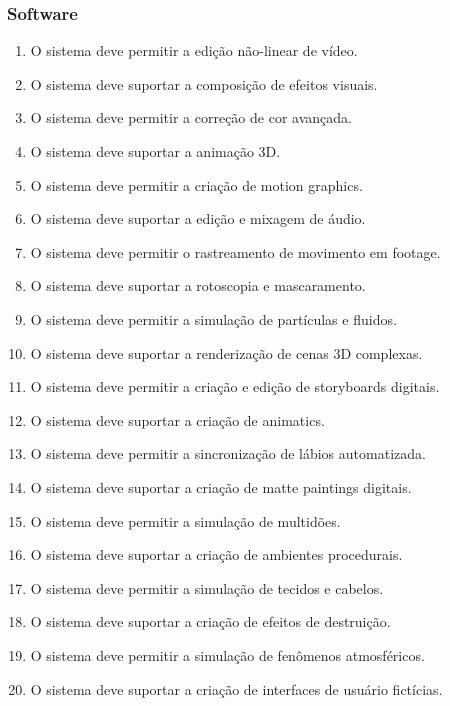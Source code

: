 \subsubsection{Software}
\begin{enumerate}
  \item O sistema deve permitir a edição não-linear de vídeo.
  \item O sistema deve suportar a composição de efeitos visuais.
  \item O sistema deve permitir a correção de cor avançada.
  \item O sistema deve suportar a animação 3D.
  \item O sistema deve permitir a criação de motion graphics.
  \item O sistema deve suportar a edição e mixagem de áudio.
  \item O sistema deve permitir o rastreamento de movimento em footage.
  \item O sistema deve suportar a rotoscopia e mascaramento.
  \item O sistema deve permitir a simulação de partículas e fluidos.
  \item O sistema deve suportar a renderização de cenas 3D complexas.
  \item O sistema deve permitir a criação e edição de storyboards digitais.
  \item O sistema deve suportar a criação de animatics.
  \item O sistema deve permitir a sincronização de lábios automatizada.
  \item O sistema deve suportar a criação de matte paintings digitais.
  \item O sistema deve permitir a simulação de multidões.
  \item O sistema deve suportar a criação de ambientes procedurais.
  \item O sistema deve permitir a simulação de tecidos e cabelos.
  \item O sistema deve suportar a criação de efeitos de destruição.
  \item O sistema deve permitir a simulação de fenômenos atmosféricos.
  \item O sistema deve suportar a criação de interfaces de usuário fictícias.
\end{enumerate}

